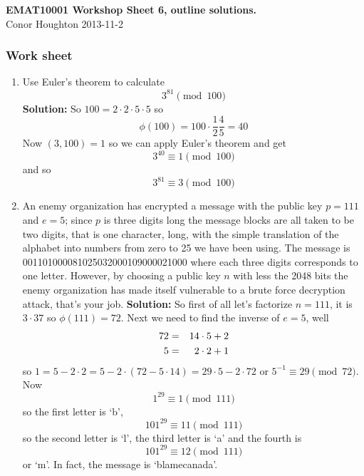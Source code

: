 \documentclass[12pt]{article}
\begin{document}
\begin{center}
{\bf EMAT10001 Workshop Sheet 6, outline solutions.}\\[1cm]{} Conor Houghton 2013-11-2
\end{center}

\subsubsection*{Work sheet}


\begin{enumerate}
\item Use Euler's theorem to calculate
\begin{equation}
3^{81}\pmod{100}
\end{equation}
\textbf{Solution: } So $100=2\cdot 2\cdot 5\cdot 5$ so 
\begin{equation}
\phi(100)=100\cdot\frac{1}{2}\frac{4}{5}=40
\end{equation}
Now $(3,100)=1$ so we can apply Euler's theorem and get
\begin{equation}
3^{40}\equiv 1 \pmod{100}
\end{equation}
and so
\begin{equation}
3^{81}\equiv 3 \pmod{100}
\end{equation}
\item An enemy organization has encrypted a message with the public
  key $p=111$ and $e=5$; since $p$ is three digits long the message
  blocks are all taken to be two digits, that is one character, long,
  with the simple translation of the alphabet into numbers from zero
  to 25 we have been using. The message is
  001101000081025032000109000021000 where each three digits
  corresponds to one letter. However, by choosing a public key $n$
  with less the 2048 bits the enemy organization has made itself
  vulnerable to a brute force decryption attack, that's your job.
  \textbf{Solution: } So first of all let's factorize $n=111$, it is
  $3\cdot 37$ so $\phi(111)=72$. Next we need to find the inverse of
  $e=5$, well
\begin{eqnarray}
72&=&14\cdot 5+2\cr
5&=&2\cdot 2+1
\end{eqnarray}
so $1=5-2\cdot 2=5-2\cdot(72-5\cdot 14)=29\cdot 5-2\cdot 72$ or $5^{-1}\equiv 29 \pmod{72}$. Now
\begin{equation}
1^{29}\equiv 1\pmod{111}
\end{equation}
so the first letter is \lq{}b\rq{},
\begin{equation}
101^{29}\equiv 11\pmod{111}
\end{equation}
so the second letter is \lq{}l\rq{}, the third letter is \lq{}a\rq{} and the fourth is 
\begin{equation}
101^{29}\equiv 12\pmod{111}
\end{equation}
or \lq{}m\rq{}. In fact, the message is \lq{}blamecanada\rq{}.


\end{enumerate}
\end{document}
